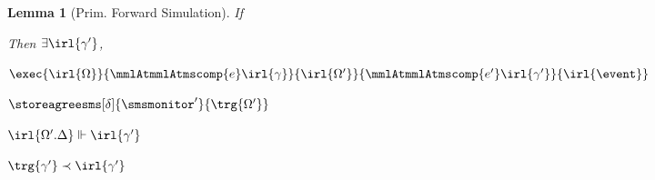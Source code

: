 \documentclass[a4paper,names,dvipsnames]{article}
\newtheorem{lemma}{Lemma}
\begin{document}
\begin{lemma}[Prim. Forward Simulation]\label{lem:sms:ctxforwardsim}
  If
  Then $\exists \irl{\gamma'}$,
  \begin{goals}
    \item $\exec{\irl{\Omega}}{\mmlAtmmlAtmscomp{e}\irl{\gamma}}{\irl{\Omega'}}{\mmlAtmmlAtmscomp{e'}\irl{\gamma'}}{\irl{\event}}$
    \item $\storeagreesms[\delta]{\smsmonitor'}{\trg{\Omega'}}$
    \item $\irl{\Omega'.\Delta}\Vdash\irl{\gamma'}$
    \item $\trg{\gamma'}\prec\irl{\gamma'}$
  \end{goals}
\end{lemma}
\end{document}
